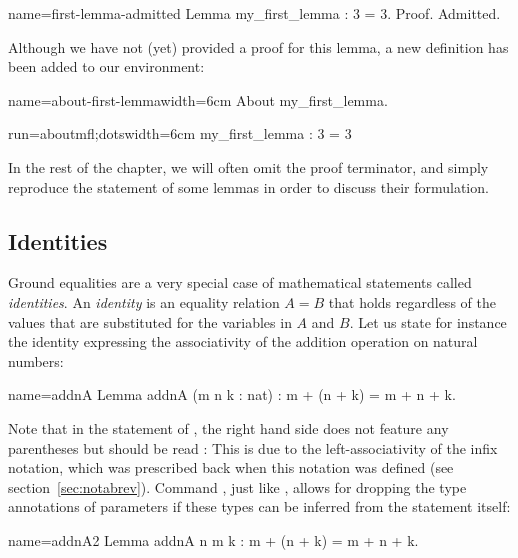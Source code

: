 \begin{coq}{name=first-lemma-admitted}{}
Lemma my_first_lemma : 3 = 3.
Proof.
Admitted.
\end{coq}

Although we have not (yet) provided a proof for this lemma, a new
definition has been added to our environment:

\begin{coq-left}{name=about-first-lemma}{width=6cm}
About my_first_lemma.
\end{coq-left}
\begin{coqout-right}{run=aboutmfl;dots}{width=6cm}
my_first_lemma : 3 = 3
\end{coqout-right}


In the rest of the chapter, we will often omit the  proof
terminator, and simply reproduce the statement of some lemmas in
order to discuss their formulation.

\subsection{Identities}\label{ssec:id}

Ground equalities are a very special case of mathematical
statements called \emph{identities}. An \emph{identity} is an equality
relation $A = B$ that holds regardless of the values that are
substituted for the variables in $A$ and $B$.
Let us state for instance the identity expressing the associativity of
the addition operation on natural numbers:

\begin{coq}{name=addnA}{}
Lemma addnA (m n k : nat) : m + (n + k) = m + n + k.
\end{coq}

Note that in the statement of , the right hand side does not
feature any parentheses but should be read : This
is due to the left-associativity of the infix \C{+} notation, which
was prescribed back when this notation was defined (see
section~\ref{sec:notabrev}). Command
, just like , allows for
dropping the type annotations of parameters if these types can be
inferred from the statement itself:

\begin{coq}{name=addnA2}{}
Lemma addnA n m k : m + (n + k) = m + n + k.
\end{coq}

